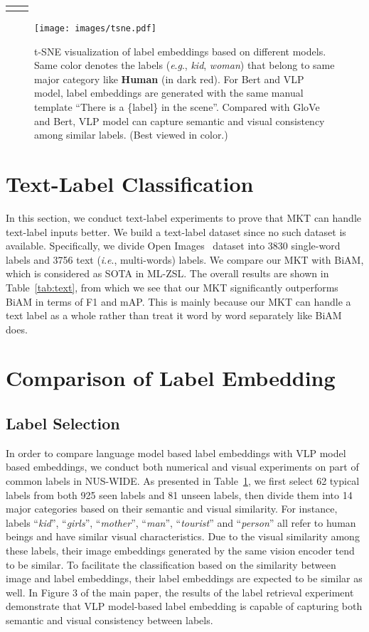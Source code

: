 \documentclass[letterpaper]{article} \usepackage{aaai23}  \usepackage{times}  \usepackage{helvet}  \usepackage{courier}  \usepackage[hyphens]{url}  \usepackage{graphicx} \urlstyle{rm} \def\UrlFont{\rm}  \usepackage{natbib}  \usepackage{caption} \frenchspacing  \setlength{\pdfpagewidth}{8.5in}  \setlength{\pdfpageheight}{11in}
\newcommand{\eg}{\textit{e}.\textit{g}.}
\newcommand{\ie}{\textit{i}.\textit{e}.}
\begin{document}
\begin{table}[ht]
{\begin{tabular}{cl}
\toprule[0.15em]
\label{tab:labellist}
\end{tabular}}
\end{table} \begin{figure*}[ht]
    \centering
    \texttt{[image: images/tsne.pdf]}
\caption{
t-SNE visualization of label embeddings based on different models.
Same color denotes the labels (\eg, \textit{kid}, \textit{woman}) that belong to same major category like \textbf{Human} (in dark red).  
For Bert and VLP model, label embeddings are generated with the same manual template ``There is a \{label\} in the scene''. Compared with GloVe and Bert, VLP model can capture semantic and visual consistency among similar labels. (Best viewed in color.) 
    }
    \label{fig:labelemb}
\end{figure*} 

\section{Text-Label Classification} 
In this section, we conduct text-label experiments to prove that MKT can handle text-label inputs better. 
We build a text-label dataset since no such dataset is available.
Specifically, we divide Open Images~\cite{openiamge} dataset into 3830 single-word labels and 3756 text (\ie, multi-words) labels. 
We compare our MKT with BiAM, which is considered as SOTA in ML-ZSL.  
The overall results are shown in Table~\ref{tab:text}, from which we see that our MKT significantly outperforms BiAM in terms of F1 and mAP. 
This is mainly because our MKT can handle a text label as a whole rather than treat it word by word separately like BiAM does.


\section{Comparison of Label Embedding}
\subsection{Label Selection}
In order to compare language model based label embeddings with VLP model based embeddings, we conduct both numerical and visual experiments on part of common labels in NUS-WIDE. 
As presented in Table~\ref{tab:labellist}, we first select 62 typical labels from both 925 seen labels and 81 unseen labels, then divide them into 14 major categories based on their semantic and visual similarity.
For instance, labels ``\textit{kid}'', ``\textit{girls}'', ``\textit{mother}'', ``\textit{man}'', ``\textit{tourist}'' and ``\textit{person}'' all refer to human beings and have similar visual characteristics. 
Due to the visual similarity among these labels, their image embeddings generated by the same vision encoder tend to be similar.
To facilitate the classification based on the similarity between image and label embeddings, their label embeddings are expected to be similar as well.
In Figure 3 of the main paper, the results of the label retrieval experiment demonstrate that VLP model-based label embedding is capable of capturing both semantic and visual consistency between labels. 
\end{document}
